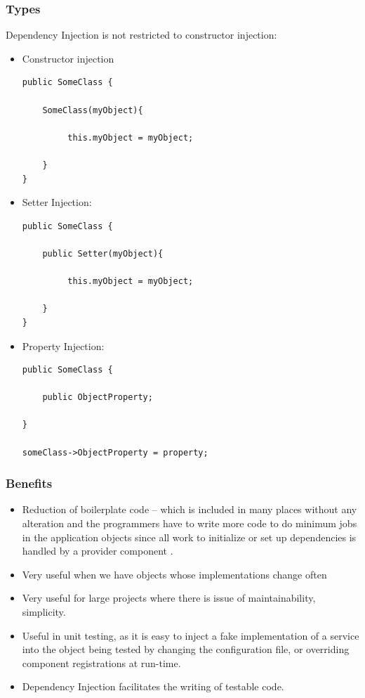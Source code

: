 \documentclass[14pt,a4paper]{extreport}
\begin{document}
			\subsubsection{Types}
			Dependency Injection is not restricted to constructor injection:

\begin{itemize}
\item Constructor injection
\begin{verbatim}
public SomeClass {

	SomeClass(myObject){
	
		 this.myObject = myObject;
		 
	}
}
\end{verbatim}
\item Setter Injection:
\begin{verbatim}
public SomeClass {

	public Setter(myObject){
	
		 this.myObject = myObject;
		 
	}
}
\end{verbatim}
\item  Property Injection:
\begin{verbatim}
public SomeClass {

	public ObjectProperty;
	
}

someClass->ObjectProperty = property;
\end{verbatim}
\end{itemize}
		\subsubsection{Benefits}
\begin{itemize}
\item Reduction of boilerplate code – which is included in many places without any alteration and the programmers have to write more code to do minimum jobs in the application objects since all work to initialize or set up dependencies is handled by a provider component . 
\item Very useful when we have objects whose implementations change often 
\item Very useful for large projects where there is issue of maintainability, simplicity.

\item Useful in unit testing, as it is easy to inject a fake implementation of a service into the object being tested by changing the configuration file, or overriding component registrations at run-time.

\item Dependency Injection facilitates the writing of testable code.
\end{itemize}
\end{document}
